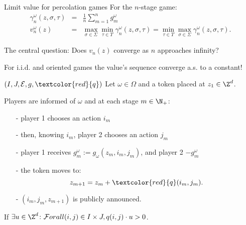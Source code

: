 \begin{frame}{Limit value for percolation games}
  For the $n$-stage game:
  \begin{eqnarray*}
    \gamma_n^{\omega}(z, \sigma, \tau) & = & \frac{1}{n}\sum_{m=1}^ng_m^{\omega} \\
     v_n^{\omega}(z) & = & \max_{\sigma \in \Sigma}\min_{\tau \in T} \gamma_n^{\omega}(z, \sigma, \tau) = \min_{\tau \in T}\max_{\sigma \in \Sigma} \gamma_n^{\omega}(z, \sigma, \tau).
  \end{eqnarray*}
  \vspace{0.2cm}
  \pause

  The central question: Does $v_n(z)$ converge as $n$ approaches infinity?
  \pause

  \begin{knownresult}
    For i.i.d. and oriented games the value's sequence converge a.s. to a constant!
  \end{knownresult}
\end{frame}

\begin{frame}{$(I, J, \mathcal{E}, g, \textcolor{red}{q})$}
  Let $\omega \in \Omega$ and a token placed at $z_1 \in \Z^d$.
  \vspace{0.2cm}

  Players are informed of $\omega$ and at each stage $m \in \N_+$:
  \begin{itemize}
    \item[-] player 1 chooses an action $i_m$ 
    \item[-] then, knowing $i_m$, player 2 chooses an action $j_m$
    \item[-] player 1 receives $g_m^{\omega} := g_{\omega}(z_{m}, i_m, j_m)$, and player 2 $-g_m^{\omega}$
    \item[-] the token moves to:  
      \[
        z_{m+1} = z_m + \textcolor{red}{q}(i_m, j_m).
      \]
    \item[-] $(i_m, j_m, z_{m+1})$ is publicly announced.
  \end{itemize}
  
    \begin{definition}[oriented]
      \color{red} If $\exists u \in \Z^d \colon \mathcal{F}orall (i, j) \in I \times J, q(i, j) \cdot u > 0$.
    \end{definition}
\end{frame} 

